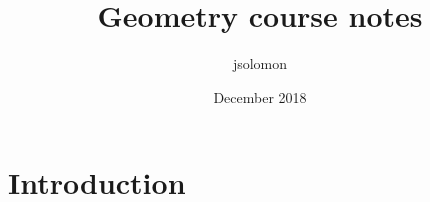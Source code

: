 \documentclass{article}
\title{Geometry course notes}
\author{jsolomon }
\date{December 2018}
\begin{document}
\maketitle

\section{Introduction}
\end{document}

